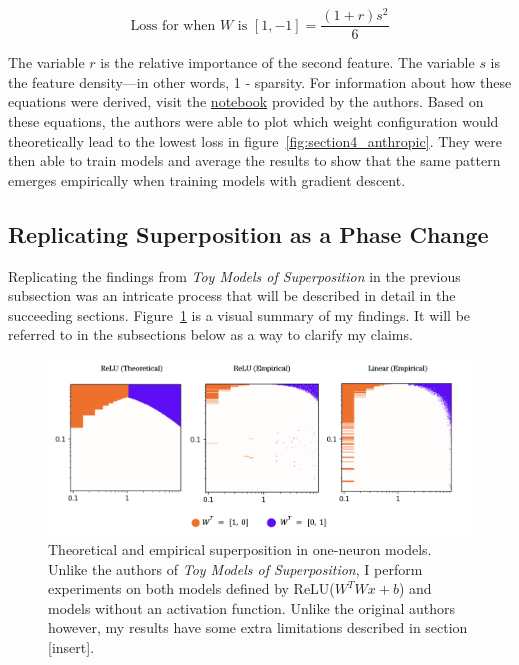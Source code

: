 \documentclass{article} %
\begin{document}
\begin{equation}
    \label{eq:loss3}
    \text{Loss for when  $W$ is $[1, -1]$} = \frac{(1 + r)s^2}{6}
\end{equation}

The variable $r$ is the relative importance of the second feature. The variable
$s$ is the feature density---in other words, 1 - sparsity. For information
about how these equations were derived, visit the
\href{https://github.com/wattenberg/superposition/blob/main/Exploring_Exact_Toy_Models.ipynb}{notebook} 
provided by the authors.
Based on these equations, the authors were able to plot which weight configuration
would theoretically lead to the lowest loss in figure~\ref{fig:section4_anthropic}.
They were then able to train models and average the results to show that the
same pattern emerges empirically when training models with gradient descent.

\subsection{Replicating Superposition as a Phase Change}

Replicating the findings from \textit{Toy Models of Superposition} in the
previous subsection was an intricate process that will be described in detail in the
succeeding sections. Figure~\ref{fig:phase_changes_replication} is a visual
summary of my findings. It will be referred to in the subsections below as a
way to clarify my claims.

\begin{figure}[h]
    \centering
    \includegraphics[width=0.99\linewidth]{phase_changes/images/phase_changes_replication.png}
    \captionsetup{font=footnotesize, width=0.7\linewidth} %
    \caption{
        Theoretical and empirical superposition in one-neuron models. Unlike
        the authors of \textit{Toy Models of Superposition}, I perform experiments
        on both models defined by ReLU($W^TWx + b$) and models without an activation
        function. Unlike the original authors however, my results have some extra
        limitations described in section [insert].
    }
    \label{fig:phase_changes_replication}
\end{figure}
\end{document}
